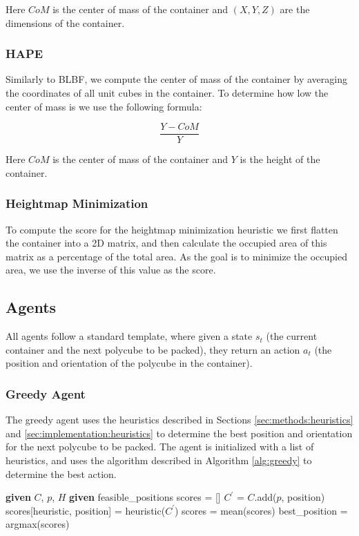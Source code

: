 \documentclass[conference]{IEEEtran}
\begin{document}
Here $CoM$ is the center of mass of the container and $(X, Y, Z)$ are the dimensions of the container.

\subsubsection{HAPE}
Similarly to BLBF, we compute the center of mass of the container by averaging the coordinates of all unit cubes in the container.
To determine how low the center of mass is we use the following formula:

\begin{equation}
    \frac{Y - CoM}{Y}
    \label{eq:hape}
\end{equation}

Here $CoM$ is the center of mass of the container and $Y$ is the height of the container.

\subsubsection{Heightmap Minimization}
To compute the score for the heightmap minimization heuristic we first flatten the container into a 2D matrix, and then calculate the occupied area of this matrix as a percentage of the total area.
As the goal is to minimize the occupied area, we use the inverse of this value as the score.

\subsection{Agents}
All agents follow a standard template, where given a state $s_t$ (the current container and the next polycube to be packed), they return an action $a_t$ (the position and orientation of the polycube in the container).

\subsubsection{Greedy Agent}
The greedy agent uses the heuristics described in Sections \ref{sec:methods:heuristics} and \ref{sec:implementation:heuristics} to determine the best position and orientation for the next polycube to be packed.
The agent is initialized with a list of heuristics, and uses the algorithm described in Algorithm \ref{alg:greedy} to determine the best action.

\begin{algorithm}[!htb]
    \caption{Greedy Agent}\label{alg:greedy}
    \begin{algorithmic}[1]
    \State \textbf{given} $C$, $p$, $H$ 
    \State \textbf{given} feasible\_positions
    \State scores = []
            \State $C^\prime$ = $C$.add($p$, position)
            \State scores[heuristic, position] = heuristic($C^\prime$)
        \EndFor
    \EndFor
    \State scores = mean(scores) 
    \State best\_position = argmax(scores)
    \end{algorithmic}
\end{algorithm}
\end{document}
